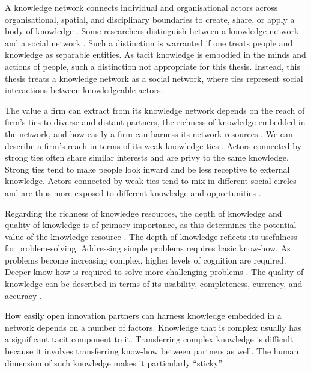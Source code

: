 A knowledge network connects individual and organisational actors across organisational, spatial, and disciplinary boundaries to create, share, or apply a body of knowledge \citep{pugh2013designing}. Some researchers distinguish between a knowledge network and a social network \citep[e.g.][]{yayavaram2008decomposability,wang2014knowledge,brennecke2017firm}. Such a distinction is warranted if one treats people and knowledge as separable entities. As tacit knowledge is embodied in the minds and actions of people, such a distinction not appropriate for this thesis. Instead, this thesis treats a knowledge network as a social network, where ties represent social interactions between knowledgeable actors. \medskip

The value a firm can extract from its knowledge network depends on the reach of firm's ties to diverse and distant partners, the richness of knowledge embedded in the network, and how easily a firm can harness its network resources \citep{gulati2011networks}. We can describe a firm's reach in terms of its weak knowledge ties \citep{hansen1999search}. Actors connected by strong ties often share similar interests and are privy to the same knowledge. Strong ties tend to make people look inward and be less receptive to external knowledge. Actors connected by weak ties tend to mix in different social circles and are thus more exposed to different knowledge and opportunities \citep{granovetter1973strength}. \medskip

Regarding the richness of knowledge resources, the depth of knowledge and quality of knowledge is of primary importance, as this determines the potential value of the knowledge resource \citep{davenport1998working,kane2005knowledge}. The depth of knowledge reflects its usefulness for problem-solving. Addressing simple problems requires basic know-how. As problems become increasing complex, higher levels of cognition are required. Deeper know-how is required to solve more challenging problems \citep{webb2002depth,bennet2008depth}. The quality of knowledge can be described in terms of its usability, completeness, currency, and accuracy \citep{wixom2005theoretical}. \medskip

How easily open innovation partners can harness knowledge embedded in a network depends on a number of factors. Knowledge that is complex usually has a significant tacit component to it. Transferring complex knowledge is difficult because it involves transferring know-how between partners as well. The human dimension of such knowledge makes it particularly \enquote{sticky} \citep{von1994sticky,szulanski2003sticky}. \medskip

